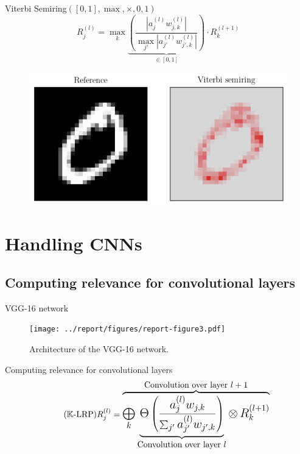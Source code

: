 \documentclass[aspectratio=169]{beamer}
\theoremstyle{definition}
\begin{document}
\begin{frame}{Viterbi Semiring}{\large $([0, 1], \max, \times, 0, 1)$}
    \begin{equation*}
        R^{(l)}_j = \max_k \underbrace{\left(\frac{\left|a^{(l)}_jw_{j, k}^{(l)}\right|}{\max_{j'} \left|a^{(l)}_{j'}w_{j', k}^{(l)}\right|}\right)}_{\in[0, 1]} \cdot R^{(l+1)}_k
    \end{equation*}

    \begin{figure}[H]
        \centering
        \includegraphics[width=.5\textwidth]{viterbi.png}
    \end{figure}
\end{frame}


\section{Handling CNNs}
\subsection{Computing relevance for convolutional layers}
\begin{frame}{VGG-16 network}
    \begin{figure}
        \centering
        \texttt{[image: ../report/figures/report-figure3.pdf]}
        \caption{Architecture of the VGG-16 network.}
        \label{fig:vgg-architecture}
    \end{figure}
\end{frame}

\begin{frame}{Computing relevance for convolutional layers}
    \begin{equation}
        \tag{$\mathbb{K}$-LRP}
        \Large
        {R^{(l)}_j = \overbrace{
            \bigoplus_k \underbrace{\Theta\left(
                \frac{a^{(l)}_jw_{j, k}}{\sum_{j'}a^{(l)}_{j'}w_{j', k}}
            \right)}
            _{\text{Convolution over layer $l$}} \otimes\, R^{(l+1)}_k}^{\text{\normalsize Convolution over layer $l+1$}}}
    \end{equation}
\end{frame}
\end{document}
